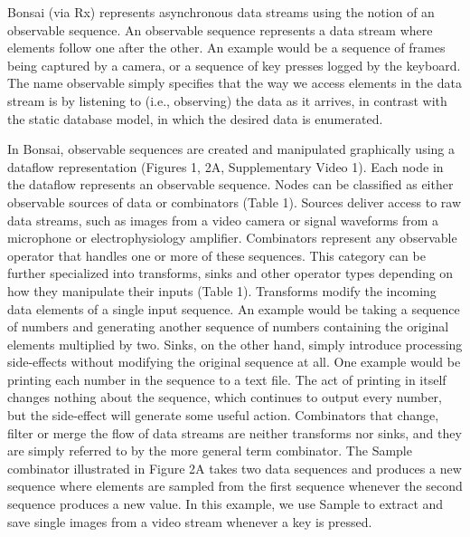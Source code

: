 Bonsai (via Rx) represents asynchronous data streams using the notion of an observable sequence. An observable sequence represents a data stream where elements follow one after the other. An example would be a sequence of frames being captured by a camera, or a sequence of key presses logged by the keyboard. The name observable simply specifies that the way we access elements in the data stream is by listening to (i.e., observing) the data as it arrives, in contrast with the static database model, in which the desired data is enumerated.

In Bonsai, observable sequences are created and manipulated graphically using a dataflow \cite{Mosconi2000, Johnston2004} representation (Figures 1, 2A, Supplementary Video 1). Each node in the dataflow represents an observable sequence. Nodes can be classified as either observable sources of data or combinators (Table 1). Sources deliver access to raw data streams, such as images from a video camera or signal waveforms from a microphone or electrophysiology amplifier. Combinators represent any observable operator that handles one or more of these sequences. This category can be further specialized into transforms, sinks and other operator types depending on how they manipulate their inputs (Table 1). Transforms modify the incoming data elements of a single input sequence. An example would be taking a sequence of numbers and generating another sequence of numbers containing the original elements multiplied by two. Sinks, on the other hand, simply introduce processing side-effects without modifying the original sequence at all. One example would be printing each number in the sequence to a text file. The act of printing in itself changes nothing about the sequence, which continues to output every number, but the side-effect will generate some useful action. Combinators that change, filter or merge the flow of data streams are neither transforms nor sinks, and they are simply referred to by the more general term combinator. The Sample combinator illustrated in Figure 2A takes two data sequences and produces a new sequence where elements are sampled from the first sequence whenever the second sequence produces a new value. In this example, we use Sample to extract and save single images from a video stream whenever a key is pressed.

